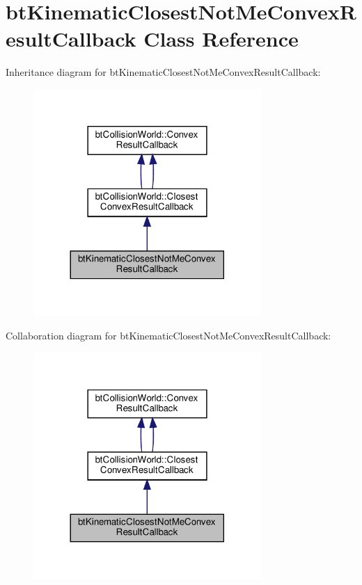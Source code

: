 \hypertarget{classbtKinematicClosestNotMeConvexResultCallback}{}\section{bt\+Kinematic\+Closest\+Not\+Me\+Convex\+Result\+Callback Class Reference}
\label{classbtKinematicClosestNotMeConvexResultCallback}


Inheritance diagram for bt\+Kinematic\+Closest\+Not\+Me\+Convex\+Result\+Callback\+:
\nopagebreak
\begin{figure}[H]
\begin{center}
\leavevmode
\includegraphics[width=245pt]{classbtKinematicClosestNotMeConvexResultCallback__inherit__graph}
\end{center}
\end{figure}


Collaboration diagram for bt\+Kinematic\+Closest\+Not\+Me\+Convex\+Result\+Callback\+:
\nopagebreak
\begin{figure}[H]
\begin{center}
\leavevmode
\includegraphics[width=245pt]{classbtKinematicClosestNotMeConvexResultCallback__coll__graph}
\end{center}
\end{figure}
